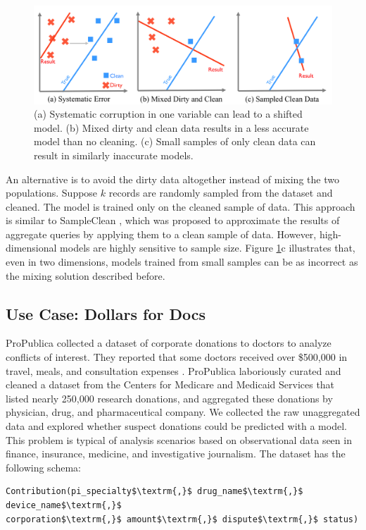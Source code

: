 \begin{figure}[ht!]
\centering
 \includegraphics[width=\columnwidth]{figs/update-arch.png}
 \caption{(a) Systematic corruption in one variable can lead to a shifted model. 
 (b) Mixed dirty and clean data results in a less accurate model than no cleaning.
(c) Small samples of only clean data can result in similarly inaccurate models. \label{update-arch1}}
\end{figure}

An alternative is to avoid the dirty data altogether instead of mixing the two populations.
Suppose $k$ records are randomly sampled from the dataset and cleaned.
The model is trained only on the cleaned sample of data.
This approach is similar to SampleClean \cite{wang1999sample}, which was proposed to approximate the results of aggregate queries by applying them to a clean sample of data.
However, high-dimensional models are highly sensitive to sample size.
Figure \ref{update-arch1}c illustrates that, even in two dimensions, models trained from small samples can be as incorrect as the mixing solution described before.

\subsection{Use Case: Dollars for Docs \cite{dollarsfordocs}}\label{s:usecase}
ProPublica collected a dataset of corporate donations to doctors to analyze conflicts of interest. 
They reported that some doctors received over \$500,000 in travel, meals, and consultation expenses \cite{dollarsfordocsa}.
ProPublica laboriously curated and cleaned a dataset from the Centers for Medicare and Medicaid Services that listed nearly 250,000 research donations, and aggregated these donations by physician, drug, and pharmaceutical company.
We collected the raw unaggregated data and explored whether suspect donations could be predicted with a model.
This problem is typical of analysis scenarios based on observational data seen in finance, insurance, medicine, and investigative journalism.
The dataset has the following schema:
\begin{lstlisting}[mathescape,basicstyle={\scriptsize}]
Contribution(pi_specialty$\textrm{,}$ drug_name$\textrm{,}$ device_name$\textrm{,}$
corporation$\textrm{,}$ amount$\textrm{,}$ dispute$\textrm{,}$ status)
\end{lstlisting}

